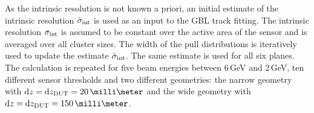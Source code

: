 As the intrinsic resolution is not known a priori, an initial estimate of the intrinsic resolution $\hat{\sigma}_{\textrm{int}}$ is used as an input to the GBL track fitting. 
The intrinsic resolution $\sigma_{\textrm{int}}$ is assumed to be constant over the active area of the sensor and is averaged over all cluster sizes. 
The width of the pull distributions is iteratively used to update the estimate $\hat{\sigma}_{\textrm{int}}$. 
The same estimate is used for all six planes. 
The calculation is repeated for five beam energies between 6\,GeV and 2\,GeV, ten different sensor thresholds
 and two different geometries: the narrow geometry with $\dz = \dzdut = 20\,\milli\meter$ and the wide geometry with $\dz = \dzdut = 150\,\milli\meter$.

